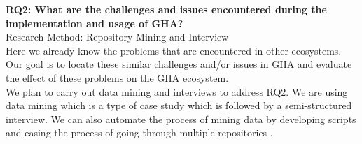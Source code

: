 \documentclass[conference]{IEEEtran}
\begin{document}
\textbf{RQ2: What are the challenges and issues encountered during the implementation and usage of GHA?}\\

Research Method: Repository Mining and Interview\\

	Here we already know the problems that are encountered in other ecosystems. Our goal is to locate these similar challenges and/or issues in GHA and evaluate the effect of these problems on the GHA ecosystem.\\

	We plan to carry out data mining and interviews to address RQ2. We are using data mining which is  a type of case study which is followed by a semi-structured interview. We can also automate the process of mining data by developing scripts and easing the process of going through multiple repositories \cite{chaturvedi2013tools}.\\
\end{document}
